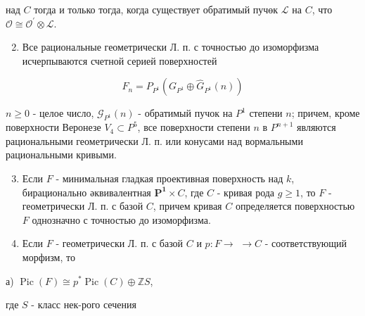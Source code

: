 \documentclass[10pt]{article}
\begin{document}
над $C$ тогда и только тогда, когда существует обратимый пучөк $\mathscr{L}$ на $C$, что $\mathscr{O} \cong \mathscr{O}^{\prime} \otimes \mathscr{L}$.



\begin{enumerate}

  \setcounter{enumi}{1}

  \item Все рациональные геометрически Л. п. с точностью до изоморфизма исчерпываются счетной серией поверхностей

\end{enumerate}



\[

F_{n}=P_{P^{1}}\left(G_{P^{1}} \oplus \widehat{G}_{P^{1}}(n)\right)

\]



$n \geqslant 0$ - целое число, $\mathcal{G}_{P^{1}}(n)$ - обратимый пучок на $P^{1}$ степени $n$; причем, кроме поверхности Веронезе $V_{4} \subset P^{5}$, все поверхности степени $n$ в $P^{n+1}$ являются рациональными геометрически Л. п. или конусами над вормальными рациональными кривыми.



\begin{enumerate}

  \setcounter{enumi}{2}

  \item Если $F$ - минимальная гладкая проективная поверхность над $k$, бирационально әквивалентная $\boldsymbol{P}^{\mathbf{1}} \times C$, где $C$ - кривая рода $g \geqslant 1$, то $F$ - геометрически Л. п. с базой $C$, причем кривая $C$ определяется поверхностью $F$ однозначно с точностью до изоморфизма.



  \item Если $F$ - геометрически Л. п. с базой $C$ и $p: F \rightarrow$ $\rightarrow C$ - соответствующий морфизм, то



\end{enumerate}



а) $\operatorname{Pic}(F) \cong p^{*} \operatorname{Pic}(C) \oplus \mathbb{Z} S$,



где $S$ - класс нек-рого сечения
\end{document}
